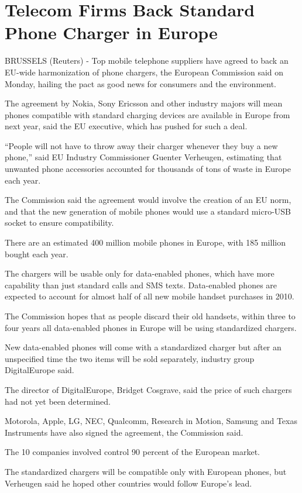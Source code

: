﻿\documentclass[12pt]{article}
\begin{document}
\section{Telecom Firms Back Standard Phone Charger in Europe}

BRUSSELS (Reuters) - Top mobile telephone suppliers have agreed to back an EU-wide harmonization of
phone chargers, the European Commission said on Monday, hailing the pact as good news for consumers
and the environment.

The agreement by Nokia, Sony Ericsson and other industry majors will mean phones compatible with
standard charging devices are available in Europe from next year, said the EU executive, which has
pushed for such a deal.

``People will not have to throw away their charger whenever they buy a new phone,'' said EU Industry
Commissioner Guenter Verheugen, estimating that unwanted phone accessories accounted for thousands
of tons of waste in Europe each year.

The Commission said the agreement would involve the creation of an EU norm, and that the new
generation of mobile phones would use a standard micro-USB socket to ensure compatibility.

There are an estimated 400 million mobile phones in Europe, with 185 million bought each year.

The chargers will be usable only for data-enabled phones, which have more capability than just
standard calls and SMS texts. Data-enabled phones are expected to account for almost half of all new
mobile handset purchases in 2010.

The Commission hopes that as people discard their old handsets, within three to four years all
data-enabled phones in Europe will be using standardized chargers.

New data-enabled phones will come with a standardized charger but after an unspecified time the two
items will be sold separately, industry group DigitalEurope said.

The director of DigitalEurope, Bridget Cosgrave, said the price of such chargers had not yet been
determined.

Motorola, Apple, LG, NEC, Qualcomm, Research in Motion, Samsung and Texas Instruments have also
signed the agreement, the Commission said.

The 10 companies involved control 90 percent of the European market.

The standardized chargers will be compatible only with European phones, but Verheugen said he hoped
other countries would follow Europe's lead.
\end{document}
